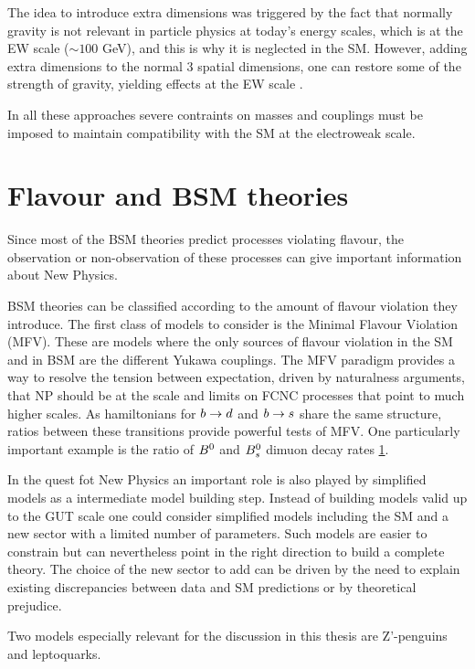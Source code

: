 The idea to introduce extra dimensions was triggered by the fact that normally gravity is not relevant
in particle physics at today's energy scales, which is at the EW scale ($\sim 100$ GeV), and this is why
it is neglected in the SM. However, adding extra dimensions to the normal 3 spatial dimensions,
one can restore some of the strength of gravity, yielding effects at the EW scale \cite{Randall:1999ee}.

In all these approaches severe contraints on masses and couplings must be imposed to maintain
compatibility with the SM at the electroweak scale.

\section{Flavour and BSM theories}

Since most of the BSM theories predict processes violating flavour, the observation or non-observation
of these processes can give important information about New Physics.

BSM theories can be classified according to the amount of flavour violation they introduce.
The first class of models to consider is the Minimal Flavour Violation (MFV).
These are models where the only sources of flavour violation in the SM and in BSM
are the different Yukawa couplings.
The MFV paradigm provides a way to resolve the tension between expectation, driven by naturalness arguments,
that NP should be at the \tev scale and limits on FCNC processes that point to much higher scales.
As hamiltonians for $b\rightarrow d$ and $b\rightarrow s$ share the same structure,
ratios between these transitions provide powerful tests of MFV.
One particularly important example is the ratio of $B^0$ and $B^0_s$ dimuon decay rates \ref{}.

In the quest fot New Physics an important role is also played by simplified models
as a intermediate model building step. Instead of building models valid up to the GUT scale
one could consider simplified models including the SM and a new sector with a limited number
of parameters. Such models are easier to constrain but can nevertheless point in the right direction
to build a complete theory. The choice of the new sector to add can be driven by the need to
explain existing discrepancies between data and SM predictions or by theoretical prejudice.

Two models especially relevant for the discussion in this thesis are Z'-penguins and leptoquarks.

